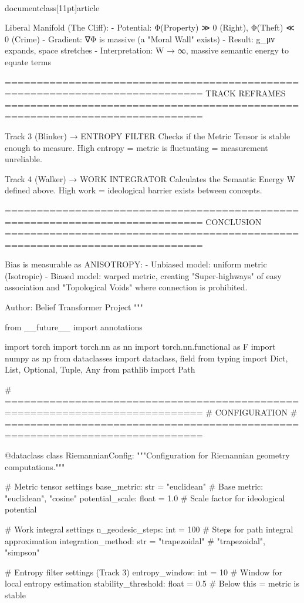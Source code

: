 \\documentclass[11pt]{article}
\begin{document}
\begin{CodeBlock}
   Liberal Manifold (The Cliff):
   - Potential: Φ(Property) ≫ 0 (Right), Φ(Theft) ≪ 0 (Crime)
   - Gradient: ∇Φ is massive (a "Moral Wall" exists)
   - Result: g_μν expands, space stretches
   - Interpretation: W → ∞, massive semantic energy to equate terms

=============================================================================
TRACK REFRAMES
=============================================================================

Track 3 (Blinker) → ENTROPY FILTER
    Checks if the Metric Tensor is stable enough to measure.
    High entropy = metric is fluctuating = measurement unreliable.

Track 4 (Walker) → WORK INTEGRATOR
    Calculates the Semantic Energy W defined above.
    High work = ideological barrier exists between concepts.

=============================================================================
CONCLUSION
=============================================================================

Bias is measurable as ANISOTROPY:
- Unbiased model: uniform metric (Isotropic)
- Biased model: warped metric, creating "Super-highways" of easy
  association and "Topological Voids" where connection is prohibited.

Author: Belief Transformer Project
"""

from __future__ import annotations

import torch
import torch.nn as nn
import torch.nn.functional as F
import numpy as np
from dataclasses import dataclass, field
from typing import Dict, List, Optional, Tuple, Any
from pathlib import Path


# =============================================================================
# CONFIGURATION
# =============================================================================

@dataclass
class RiemannianConfig:
    """Configuration for Riemannian geometry computations."""

    # Metric tensor settings
    base_metric: str = "euclidean"  # Base metric: "euclidean", "cosine"
    potential_scale: float = 1.0     # Scale factor for ideological potential

    # Work integral settings
    n_geodesic_steps: int = 100      # Steps for path integral approximation
    integration_method: str = "trapezoidal"  # "trapezoidal", "simpson"

    # Entropy filter settings (Track 3)
    entropy_window: int = 10         # Window for local entropy estimation
    stability_threshold: float = 0.5 # Below this = metric is stable


\end{CodeBlock}
\end{document}

